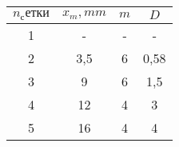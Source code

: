 \begin{tabular}{| c | c | c | c |}
\hline
$n_сетки$ & $x_m, mm$ & $m$ & $D$\\
\hline
1 & - & - & -\\
\hline
2 & 3,5 & 6 & 0,58\\
\hline
3 & 9 & 6 & 1,5\\
\hline
4 & 12 & 4 & 3\\
\hline
5 & 16 & 4 & 4\\
\hline
\end{tabular}
